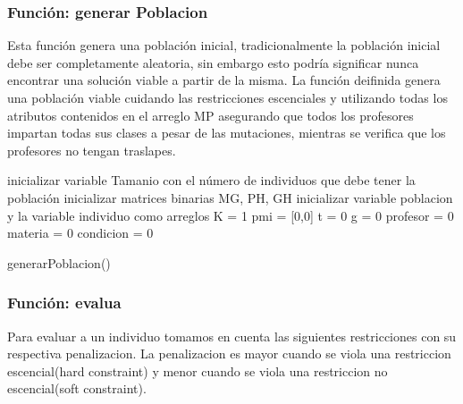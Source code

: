 \subsubsection{Funci\'on: generar Poblacion}

Esta función genera una población inicial, tradicionalmente la población inicial debe ser completamente aleatoria, sin embargo esto podría significar nunca encontrar una solución viable a partir de la misma. La función deifinida genera una población viable cuidando  las restricciones escenciales y utilizando todas los atributos contenidos en el arreglo MP asegurando que todos los profesores impartan todas sus clases a pesar de las mutaciones, mientras se verifica que los profesores no tengan traslapes.

\begin{algorithm}[H]
	\DontPrintSemicolon
	\SetAlgoLined
	inicializar variable Tamanio con el n\'umero de individuos que debe tener la poblaci\'on\;
	inicializar matrices binarias MG, PH, GH\;
	inicializar variable poblacion y la variable individuo como arreglos\;
	K = 1\;
	pmi = [0,0] \;
	t = 0\;
	g = 0\;
	profesor = 0\;
	materia = 0\;
	condicion = 0\;
	
	\caption{generarPoblacion()}
\end{algorithm}

\subsubsection{Funci\'on: evalua}

Para evaluar a un individuo tomamos en cuenta las siguientes restricciones con su respectiva penalizacion. La penalizacion es mayor cuando se viola una restriccion escencial(hard constraint) y menor cuando se viola una restriccion no escencial(soft constraint).

